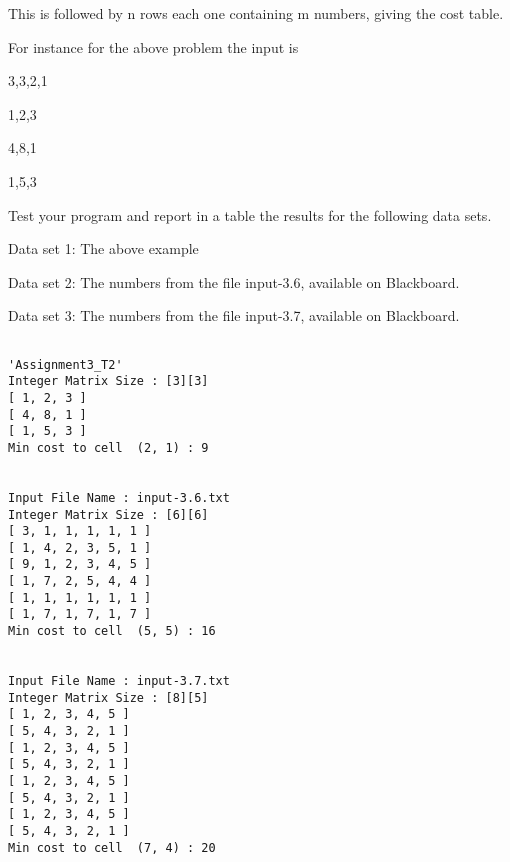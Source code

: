 \documentclass[11pt]{article}
\begin{document}
This is followed by n rows each one containing m numbers, giving the cost table.

For instance for the above problem the input is

3,3,2,1

1,2,3

4,8,1

1,5,3


Test your program and report in a table the results for the following data sets.

Data set 1:  The above example

Data set 2:  The  numbers from the file input-3.6, available on Blackboard. 

Data set 3:  The  numbers from the file input-3.7, available on Blackboard. 

\pagebreak



\begin{verbatim}
    
'Assignment3_T2' 
Integer Matrix Size : [3][3]
[ 1, 2, 3 ]
[ 4, 8, 1 ]
[ 1, 5, 3 ]
Min cost to cell  (2, 1) : 9


Input File Name : input-3.6.txt
Integer Matrix Size : [6][6]
[ 3, 1, 1, 1, 1, 1 ]
[ 1, 4, 2, 3, 5, 1 ]
[ 9, 1, 2, 3, 4, 5 ]
[ 1, 7, 2, 5, 4, 4 ]
[ 1, 1, 1, 1, 1, 1 ]
[ 1, 7, 1, 7, 1, 7 ]
Min cost to cell  (5, 5) : 16


Input File Name : input-3.7.txt
Integer Matrix Size : [8][5]
[ 1, 2, 3, 4, 5 ]
[ 5, 4, 3, 2, 1 ]
[ 1, 2, 3, 4, 5 ]
[ 5, 4, 3, 2, 1 ]
[ 1, 2, 3, 4, 5 ]
[ 5, 4, 3, 2, 1 ]
[ 1, 2, 3, 4, 5 ]
[ 5, 4, 3, 2, 1 ]
Min cost to cell  (7, 4) : 20
\end{verbatim}
\end{document}
